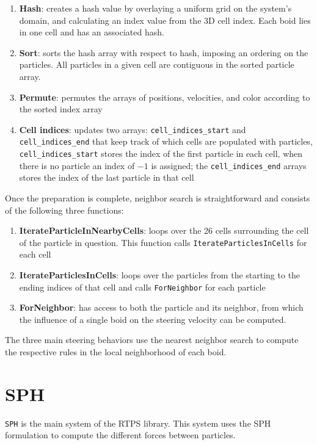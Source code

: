 \begin{enumerate}
\item{\textbf{Hash}: creates a hash value by overlaying a uniform grid on the system's domain, and calculating an index value from the 3D cell index. Each boid lies in one cell and has an associated hash.}
\item{\textbf{Sort}: sorts the hash array with respect to hash, imposing an ordering on the particles. All particles in a given cell are contiguous in the sorted particle array.}
\item{\textbf{Permute}:  permutes the arrays of positions, velocities, and color according to the sorted index array}
\item{\textbf{Cell indices}: updates two arrays: \texttt{cell\_indices\_start} and \texttt{cell\_indices\_end} that keep track of which cells are populated with particles, \texttt{cell\_indices\_start} stores the index of the first particle in each cell, when there is no particle an index of $-1$ is assigned; the \texttt{cell\_indices\_end} arrays stores the index of the last particle in that cell}
\end{enumerate}

Once the preparation is complete, neighbor search is straightforward and consists of the following three functions:  

\begin{enumerate}
\item{\textbf{IterateParticleInNearbyCells}: loops over the 26 cells surrounding the cell of the particle in question. This function calls \texttt{IterateParticlesInCells} for each cell }
\item{\textbf{IterateParticlesInCells}: loops over the particles from the starting to the ending indices of that cell and calls \texttt{ForNeighbor} for each particle}
\item{\textbf{ForNeighbor}: has access to both the particle and its neighbor, from which the influence of a single boid on the steering velocity can be computed.}
\end{enumerate}

The three main steering behaviors use the nearest neighbor search to compute the respective rules in the local neighborhood of each boid.

\section{SPH}\label{sphsection}
\texttt{SPH} is the main system of the RTPS library. This system uses the SPH formulation to compute the different forces between particles.


